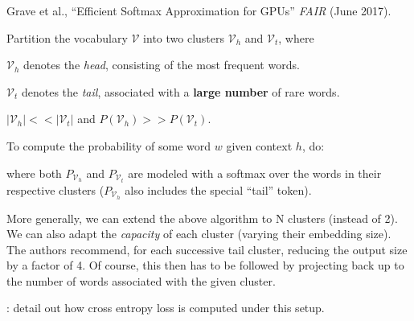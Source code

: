 \documentclass[11pt]{article}
\begin{document}
\vspace{-1em}
{\footnotesize Grave et al., ``Efficient Softmax Approximation for GPUs'' \textit{FAIR} (June 2017).}

\begin{algorithm}
	Partition the vocabulary $\mathcal V$ into two clusters $\mathcal{V}_h$ and $\mathcal V_t$, where
	\begin{compactitem}
		\item $\mathcal V_h$ denotes the \textit{head}, consisting of the most frequent words.
		
		\item $\mathcal V_t$ denotes the \textit{tail}, associated with a \textbf{large number} of rare words.
		
		\item $|\mathcal V_h | << |\mathcal V_t|$ and $P(\mathcal V_h) >> P(\mathcal V_t)$.  
	\end{compactitem}

	To compute the probability of some word $w$ given context $h$, do:
	
	where both $P_{\mathcal V_h}$ and $P_{\mathcal V_t}$ are modeled with a softmax over the words in their respective clusters ($P_{\mathcal V_h}$ also includes the special ``tail'' token). 

\end{algorithm}

More generally, we can extend the above algorithm to N clusters (instead of 2). We can also adapt the \textit{capacity} of each cluster (varying their embedding size). The authors recommend, for each successive tail cluster, reducing the output size by a factor of 4. Of course, this then has to be followed by projecting back up to the number of words associated with the given cluster.

: detail out how cross entropy loss is computed under this setup.
\end{document}
